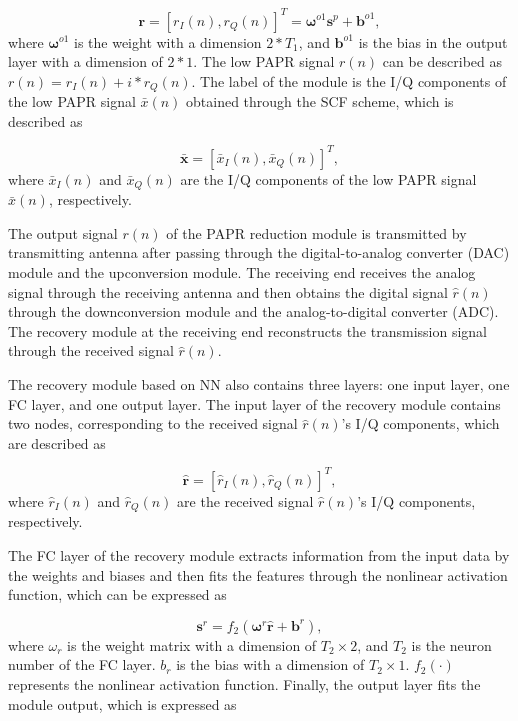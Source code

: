 \documentclass[journal]{IEEEtran}
\begin{document}
\begin{equation}
\mathbf{r} = [r_I(n), r_Q(n)]^T = \boldsymbol{\omega}^{o1} \mathbf{s}^p + \mathbf{b}^{o1},
\label{eq11}
\end{equation}
where $\boldsymbol{\omega}^{o1}$ is the weight with a dimension $2 \ast T_1$, and $\mathbf{b}^{o1}$ is the bias in the output layer with a dimension of $2 \ast 1$. The low PAPR signal $r(n)$ can be described as $r(n) = r_I(n) + i * r_Q(n)$. The label of the module is the I/Q components of the low PAPR signal $\bar{x}(n)$ obtained through the SCF scheme, which is described as

\begin{equation}
\mathbf{\bar{x}} = [\bar{x}_I(n), \bar{x}_Q(n)]^T,
\label{eq12}
\end{equation}
where $\bar{x}_I(n)$ and $\bar{x}_Q(n)$ are the I/Q components of the low PAPR signal $\bar{x}(n)$, respectively.

The output signal $r(n)$ of the PAPR reduction module is transmitted by transmitting antenna after passing through the digital-to-analog converter (DAC) module and the upconversion module. The receiving end receives the analog signal through the receiving antenna and then obtains the digital signal $\hat{r}(n)$ through the downconversion module and the analog-to-digital converter (ADC). The recovery module at the receiving end reconstructs the transmission signal through the received signal $\hat{r}(n)$.

The recovery module based on NN also contains three layers: one input layer, one FC layer, and one output layer. The input layer of the recovery module contains two nodes, corresponding to the received signal $\hat{r}(n)$'s I/Q components, which are described as

\begin{equation}
\mathbf{\hat{r}} = [\hat{r}_I(n), \hat{r}_Q(n)]^T,
\label{eq13}
\end{equation}
where $\hat{r}_I(n)$ and $\hat{r}_Q(n)$ are the received signal $\hat{r}(n)$'s I/Q components, respectively.

The FC layer of the recovery module extracts information from the input data by the weights and biases and then fits the features through the nonlinear activation function, which can be expressed as

\begin{equation}
\mathbf{s}^r = f_2(\boldsymbol{\omega}^r \mathbf{\hat{r}} + \mathbf{b}^r),
\label{eq14}
\end{equation}
where $\omega_r$ is the weight matrix with a dimension of $T_2 \times 2$, and $T_2$ is the neuron number of the FC layer. $b_r$ is the bias with a dimension of $T_2 \times 1$. $f_2(\cdot)$ represents the nonlinear activation function. Finally, the output layer fits the module output, which is expressed as
\end{document}
